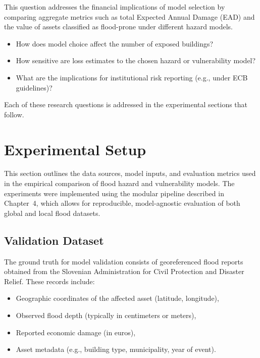 This question addresses the financial implications of model selection by comparing aggregate metrics such as total Expected Annual Damage (EAD) and the value of assets classified as flood-prone under different hazard models.

\begin{itemize}
    \item How does model choice affect the number of exposed buildings?
    \item How sensitive are loss estimates to the chosen hazard or vulnerability model?
    \item What are the implications for institutional risk reporting (e.g., under ECB guidelines)?
\end{itemize}

Each of these research questions is addressed in the experimental sections that follow.


\section{Experimental Setup}

This section outlines the data sources, model inputs, and evaluation metrics used in the empirical comparison of flood hazard and vulnerability models. The experiments were implemented using the modular pipeline described in Chapter~4, which allows for reproducible, model-agnostic evaluation of both global and local flood datasets.

\subsection{Validation Dataset}

The ground truth for model validation consists of georeferenced flood reports obtained from the Slovenian Administration for Civil Protection and Disaster Relief. These records include:

\begin{itemize}
    \item Geographic coordinates of the affected asset (latitude, longitude),
    \item Observed flood depth (typically in centimeters or meters),
    \item Reported economic damage (in euros),
    \item Asset metadata (e.g., building type, municipality, year of event).
\end{itemize}

